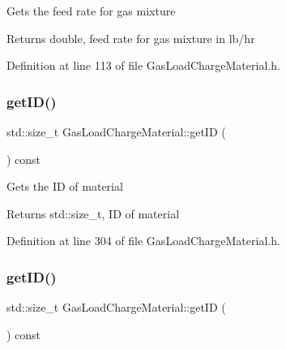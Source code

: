 Gets the feed rate for gas mixture

\begin{DoxyReturn}{Returns}
double, feed rate for gas mixture in lb/hr 
\end{DoxyReturn}


Definition at line 113 of file Gas\+Load\+Charge\+Material.\+h.

\mbox{\label{class_gas_load_charge_material_a32dc0d73857ebe4322cf525064713cf6}} 
\subsubsection{\texorpdfstring{get\+I\+D()}{getID()}\hspace{0.1cm}{\footnotesize\ttfamily [1/3]}}
{\footnotesize\ttfamily std\+::size\+\_\+t Gas\+Load\+Charge\+Material\+::get\+ID (\begin{DoxyParamCaption}{ }\end{DoxyParamCaption}) const\hspace{0.3cm}{\ttfamily [inline]}}

Gets the ID of material

\begin{DoxyReturn}{Returns}
std\+::size\+\_\+t, ID of material 
\end{DoxyReturn}


Definition at line 304 of file Gas\+Load\+Charge\+Material.\+h.

\mbox{\label{class_gas_load_charge_material_a32dc0d73857ebe4322cf525064713cf6}} 
\subsubsection{\texorpdfstring{get\+I\+D()}{getID()}\hspace{0.1cm}{\footnotesize\ttfamily [2/3]}}
{\footnotesize\ttfamily std\+::size\+\_\+t Gas\+Load\+Charge\+Material\+::get\+ID (\begin{DoxyParamCaption}{ }\end{DoxyParamCaption}) const\hspace{0.3cm}{\ttfamily [inline]}}

